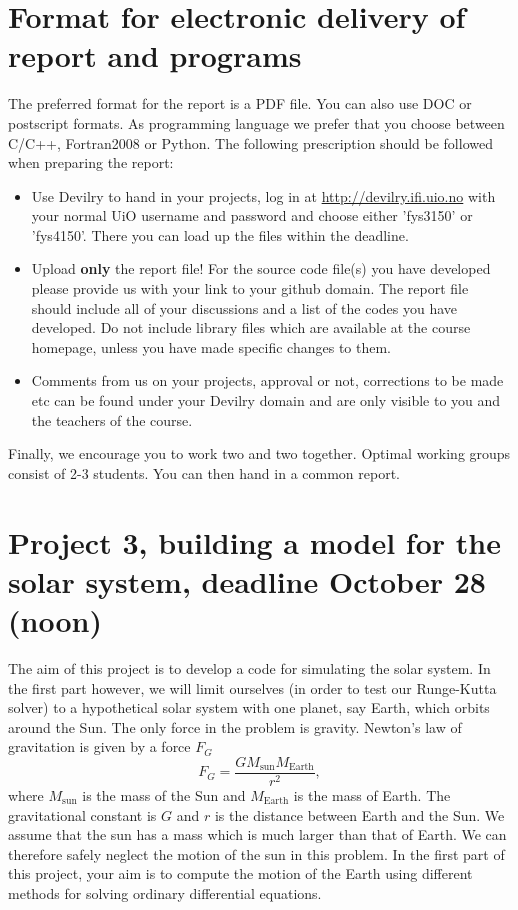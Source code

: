 \documentclass[a4wide,12pt]{article}
\begin{document}
\section*{Format for electronic delivery of report and programs}
%
The preferred format for the report is a PDF file. You can also
use DOC or postscript formats. 
As programming language we prefer that you choose between C/C++, Fortran2008 or Python.
The following prescription should be followed when preparing the report:
\begin{itemize}
\item Use Devilry to hand in your projects, log in  at 
\url{ http://devilry.ifi.uio.no} with your normal UiO username and password
and choose either 'fys3150' or 'fys4150'.
There you can load up the files within the deadline.
\item Upload {\bf only} the report file!  For the source code file(s) you have developed please provide us with your link to your github domain. 
The report file should include all of your discussions and a list of the codes you have developed. 
Do not include library files which are available at the course homepage, unless you have
made specific changes to them.
\item Comments  from us on your projects, approval or not, corrections to be made 
etc can be found under
your Devilry domain and are only visible to you and the teachers of the course.

\end{itemize}

Finally, 
we encourage you to work two and two together. Optimal working groups consist of 
2-3 students. You can then hand in a common report. 

\section*{Project 3, building a model for the solar system, deadline   October 28 (noon)}
The aim of this project is to develop a code for simulating the solar system. 
In the first part however, we will limit ourselves (in order to test our Runge-Kutta solver) 
to a hypothetical solar system
with one planet, say Earth, which orbits around the Sun.
The only force in the problem is gravity. Newton's law of gravitation  is given by a force $F_G$
\[
F_G=\frac{GM_{\mathrm{sun}}M_{\mathrm{Earth}}}{r^2},
\]
where $M_{\mathrm{sun}}$ is the mass of the Sun and $M_{\mathrm{Earth}}$ is the mass of Earth. The gravitational constant is $G$ and $r$ is the distance between Earth and the Sun.
We assume that the sun has a mass which is much larger 
than that of Earth. We can therefore safely neglect the 
motion of the sun in this problem.  In the first part of this project, your aim is to compute the motion
of the Earth using different methods for solving ordinary differential equations.
\end{document}
